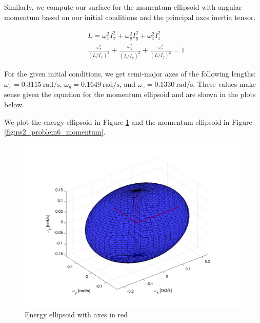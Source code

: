Similarly, we compute our surface for the momentum ellipsoid with angular momentum based on our initial conditions and the principal axes inertia tensor.

\begin{align*}
    &L = \omega_{x}^{2} I_{x}^{2} + \omega_{y}^{2} I_{y}^{2} + \omega_{z}^{2} I_{z}^{2} \\
    &\frac{\omega_{x}^{2}}{(L/I_{x})^{2}} + \frac{\omega_{y}^{2}}{(L/I_{y})^{2}} + \frac{\omega_{z}^{2}}{(L/I_{z})^{2}} = 1
\end{align*}

For the given initial conditions, we get semi-major axes of the following lengths: $\omega_{x} = \qty{0.3115}{\radian\per\second}$, $\omega_{y} = \qty{0.1649}{\radian\per\second}$, and $\omega_{z} = \qty{0.1330}{\radian\per\second}$. These values make sense given the equation for the momentum ellipsoid and are shown in the plots below.

We plot the energy ellipsoid in Figure \ref{fig:ps2_problem6_energy} and the momentum ellipsoid in Figure \ref{fig:ps2_problem6_momentum}.

\begin{figure}[H]
\centering
\includegraphics[scale=0.5]{Images/ps2_problem6_energy.png}
\caption{Energy ellipsoid with axes in red}
\label{fig:ps2_problem6_energy}
\end{figure}

